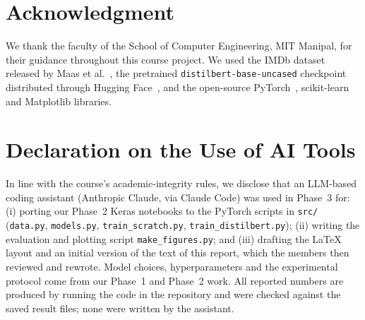 \documentclass[conference,onecolumn,a4paper,10pt]{IEEEtran}
\begin{document}
\section*{Acknowledgment}
We thank the faculty of the School of Computer Engineering, MIT Manipal, for their guidance throughout this course project. We used the IMDb dataset released by Maas et al.~\cite{maas2011}, the pretrained \texttt{distilbert-base-uncased} checkpoint distributed through Hugging Face~\cite{wolf2020}, and the open-source PyTorch~\cite{paszke2019}, scikit-learn and Matplotlib libraries.

\section*{Declaration on the Use of AI Tools}
In line with the course's academic-integrity rules, we disclose that an LLM-based coding assistant (Anthropic Claude, via Claude Code) was used in Phase~3 for: (i) porting our Phase~2 Keras notebooks to the PyTorch scripts in \texttt{src/} (\texttt{data.py}, \texttt{models.py}, \texttt{train\_scratch.py}, \texttt{train\_distilbert.py}); (ii) writing the evaluation and plotting script \texttt{make\_figures.py}; and (iii) drafting the \LaTeX{} layout and an initial version of the text of this report, which the members then reviewed and rewrote. Model choices, hyperparameters and the experimental protocol come from our Phase~1 and Phase~2 work. All reported numbers are produced by running the code in the repository and were checked against the saved result files; none were written by the assistant.
\end{document}
